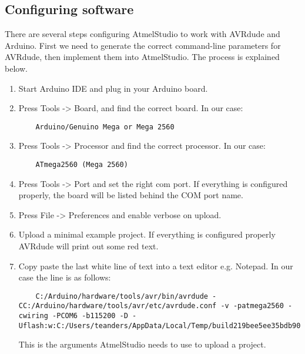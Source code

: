 \subsection{Configuring software}
There are several steps configuring AtmelStudio to work with AVRdude and Arduino. First we need to generate the correct command-line parameters for AVRdude, then implement them into AtmelStudio. The process is explained below.

\begin{enumerate}
    \item Start Arduino IDE and plug in your Arduino board.
    \item Press Tools -> Board, and find the correct board. In our case:
    \begin{lstlisting}
    Arduino/Genuino Mega or Mega 2560
    \end{lstlisting}
    \item Press Tools -> Processor and find the correct processor. In our case:
    \begin{lstlisting}
    ATmega2560 (Mega 2560)
    \end{lstlisting}
    \item Press Tools -> Port and set the right com port. If everything is configured properly, the board will be listed behind the COM port name.
    \item Press File -> Preferences and enable verbose on upload.
    \item Upload a minimal example project. If everything is configured properly AVRdude will print out some red text.
    \item Copy paste the last white line of text into a text editor e.g. Notepad. In our case the line is as follows:
    \begin{lstlisting}
    C:/Arduino/hardware/tools/avr/bin/avrdude -CC:/Arduino/hardware/tools/avr/etc/avrdude.conf -v -patmega2560 -cwiring -PCOM6 -b115200 -D -Uflash:w:C:/Users/teanders/AppData/Local/Temp/build219bee5ee35bdb906c90832b67c0fe23.tmp/teste.ino.hex:i
    \end{lstlisting}
    This is the arguments AtmelStudio needs to use to upload a project.
\end{enumerate}
\newpage

